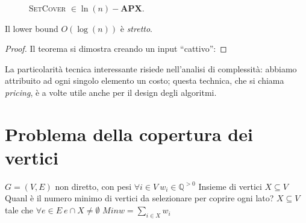 \begin{figure}[h]
	\caption{\textsc{SetCover} $\in \ln(n)-\mathbf{APX}$.}
	\label{fig:setcoverapx}
\end{figure}



\begin{theorem}
	Il lower bound $O(\log(n))$ è \textit{stretto}.
\end{theorem}
\begin{proof}
	Il teorema si dimostra creando un input ``cattivo'':
\end{proof}
La particolarità tecnica interessante risiede nell'analisi di complessità:
abbiamo attribuito ad ogni singolo elemento un costo; questa technica, che
si chiama \textit{pricing}, è a volte utile anche per il design degli algoritmi.

\section{Problema della copertura dei vertici}
 {$G = (V,E)$ non diretto, con pesi
	$\forall i \in V ~ w_i \in \mathbb{Q}^{>0}$}
{Insieme di vertici $X \subseteq V$}
{Quanl è il numero minimo di vertici da selezionare per coprire ogni lato?}
{$X \subseteq V$ tale che $\forall e \in E ~ e \cap X \neq \emptyset$}
{$Min$}{$w = \sum_{i \in X} w_i$}

